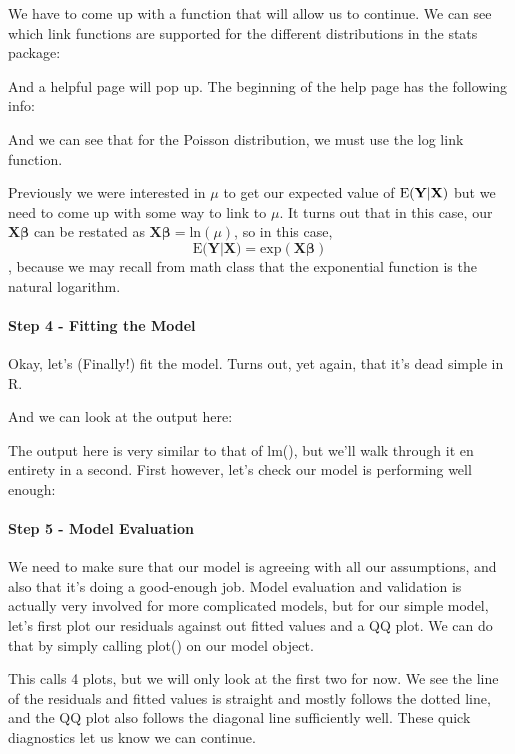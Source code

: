 \documentclass[
]{article}
\begin{document}
We have to come up with a function that will allow us to continue. We
can see which link functions are supported for the different
distributions in the stats package:

And a helpful page will pop up. The beginning of the help page has the
following info:

And we can see that for the Poisson distribution, we must use the log
link function.

Previously we were interested in \(\mu\) to get our expected value of
\(\text{E(}\bf{Y}|\bf{X})\) but we need to come up with some way to link
to \(\mu\). It turns out that in this case, our
\(\textbf{X}\boldsymbol{\beta}\) can be restated as
\(\textbf{X}\boldsymbol{\beta} = \text{ln}(\mu)\), so in this case,
\[\text{E(}\textbf{Y}|\textbf{X}) = \text{exp}(\textbf{X}\boldsymbol{\beta})\],
because we may recall from math class that the exponential function is
the natural logarithm.

\hypertarget{step-4---fitting-the-model}{%
\paragraph{Step 4 - Fitting the
Model}\label{step-4---fitting-the-model}}

Okay, let's (Finally!) fit the model. Turns out, yet again, that it's
dead simple in R.

And we can look at the output here:

The output here is very similar to that of lm(), but we'll walk through
it en entirety in a second. First however, let's check our model is
performing well enough:

\hypertarget{step-5---model-evaluation}{%
\paragraph{Step 5 - Model Evaluation}\label{step-5---model-evaluation}}

We need to make sure that our model is agreeing with all our
assumptions, and also that it's doing a good-enough job. Model
evaluation and validation is actually very involved for more complicated
models, but for our simple model, let's first plot our residuals against
out fitted values and a QQ plot. We can do that by simply calling plot()
on our model object.

This calls 4 plots, but we will only look at the first two for now. We
see the line of the residuals and fitted values is straight and mostly
follows the dotted line, and the QQ plot also follows the diagonal line
sufficiently well. These quick diagnostics let us know we can continue.
\end{document}
